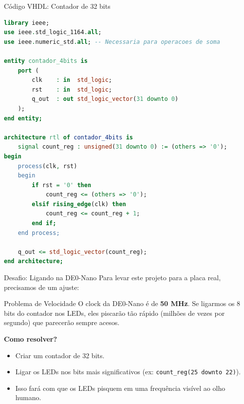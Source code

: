 \documentclass[aspectratio=169]{beamer}
\begin{document}
\begin{frame}[fragile]{Código VHDL: Contador de 32 bits}
\begin{lstlisting}[language=VHDL, basicstyle=\tiny]
library ieee;
use ieee.std_logic_1164.all;
use ieee.numeric_std.all; -- Necessaria para operacoes de soma

entity contador_4bits is
    port (
        clk    : in  std_logic;
        rst    : in  std_logic;
        q_out  : out std_logic_vector(31 downto 0)
    );
end entity;

architecture rtl of contador_4bits is
    signal count_reg : unsigned(31 downto 0) := (others => '0');
begin
    process(clk, rst)
    begin
        if rst = '0' then
            count_reg <= (others => '0');
        elsif rising_edge(clk) then
            count_reg <= count_reg + 1;
        end if;
    end process;

    q_out <= std_logic_vector(count_reg);
end architecture;
\end{lstlisting}
\end{frame}








\begin{frame}{Desafio: Ligando na DE0-Nano}
    \justifying
    Para levar este projeto para a placa real, precisamos de um ajuste:
    
    \begin{alertblock}{Problema de Velocidade}
        O clock da DE0-Nano é de \textbf{50 MHz}. Se ligarmos os 8 bits do contador nos LEDs, eles piscarão tão rápido (milhões de vezes por segundo) que parecerão sempre acesos.
    \end{alertblock}

    \textbf{Como resolver?}
    \begin{itemize}
        \item Criar um contador de 32 bits.
        \item Ligar os LEDs nos bits mais significativos (ex: \texttt{count\_reg(25 downto 22)}).
        \item Isso fará com que os LEDs pisquem em uma frequência visível ao olho humano.
    \end{itemize}
\end{frame}
\end{document}
